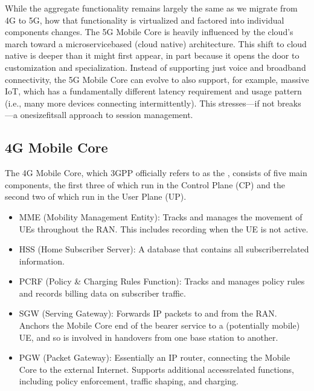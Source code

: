 \documentclass[a4paper,11pt,english]{sphinxmanual}
\begin{document}
\sphinxAtStartPar
While the aggregate functionality remains largely the same as we migrate
from 4G to 5G, how that functionality is virtualized and factored into
individual components changes. The 5G Mobile Core is heavily
influenced by the cloud’s march toward a microservice\sphinxhyphen{}based (cloud
native) architecture. This shift to cloud native is deeper than it might
first appear, in part because it opens the door to customization and
specialization. Instead of supporting just voice and broadband
connectivity, the 5G Mobile Core can evolve to also support, for
example, massive IoT, which has a fundamentally different latency
requirement and usage pattern (i.e., many more devices connecting
intermittently). This stresses—if not breaks—a one\sphinxhyphen{}size\sphinxhyphen{}fits\sphinxhyphen{}all
approach to session management.


\subsection{4G Mobile Core}
\label{\detokenize{arch:g-mobile-core}}
\sphinxAtStartPar
The 4G Mobile Core, which 3GPP officially refers to as the , consists of five main components, the first three of
which run in the Control Plane (CP) and the second two of which run in
the User Plane (UP).
\begin{itemize}
\item {} 
\sphinxAtStartPar
MME (Mobility Management Entity): Tracks and manages the movement of
UEs throughout the RAN. This includes recording when the UE is not
active.

\item {} 
\sphinxAtStartPar
HSS (Home Subscriber Server): A database that contains all
subscriber\sphinxhyphen{}related information.

\item {} 
\sphinxAtStartPar
PCRF (Policy \& Charging Rules Function): Tracks and manages policy
rules and records billing data on subscriber traffic.

\item {} 
\sphinxAtStartPar
SGW (Serving Gateway): Forwards IP packets to and from the RAN.
Anchors the Mobile Core end of the bearer service to a (potentially
mobile) UE, and so is involved in handovers from one base station to
another.

\item {} 
\sphinxAtStartPar
PGW (Packet Gateway): Essentially an IP router, connecting the Mobile
Core to the external Internet. Supports additional access\sphinxhyphen{}related
functions, including policy enforcement, traffic shaping, and
charging.

\end{itemize}
\end{document}
